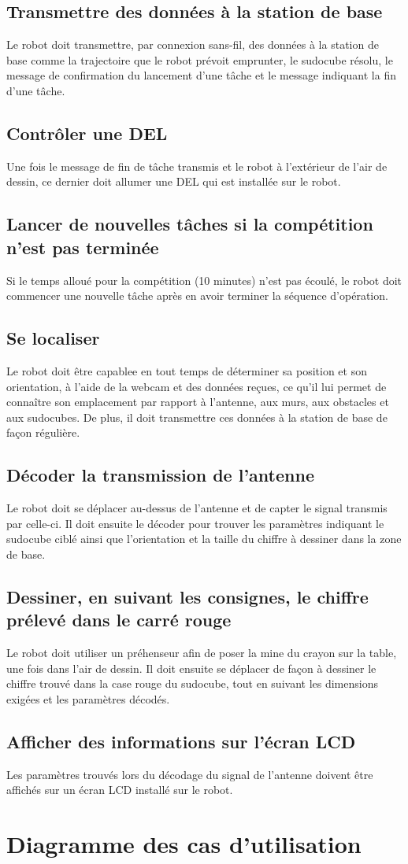 \subsection{Transmettre des données à la station de base}
Le robot doit transmettre, par connexion sans-fil, des données à la station de base comme la trajectoire que le robot prévoit emprunter, le sudocube résolu, le message de confirmation du lancement d'une tâche et le message indiquant la fin d'une tâche.
\subsection{Contrôler une DEL}
Une fois le message de fin de tâche transmis et le robot à l'extérieur de l'air de dessin, ce dernier doit allumer une DEL qui est installée sur le robot.
\subsection{Lancer de nouvelles tâches si la compétition n'est pas terminée}
Si le temps alloué pour la compétition (10 minutes) n'est pas écoulé, le robot doit commencer une nouvelle tâche après en avoir terminer la séquence d'opération.
\subsection{Se localiser}
Le robot doit être capablee en tout temps de déterminer sa position et son orientation, à l'aide de la webcam et des données reçues, ce qu'il lui permet de connaître son emplacement par rapport à l'antenne, aux murs, aux obstacles et aux sudocubes. De plus, il doit transmettre ces données à la station de base de façon régulière.
\subsection{Décoder la transmission de l'antenne}
Le robot doit se déplacer au-dessus de l'antenne et de capter le signal transmis par celle-ci. Il doit ensuite le décoder pour trouver les paramètres indiquant le sudocube ciblé ainsi que l'orientation et la taille du chiffre à dessiner dans la zone de base.
\subsection{Dessiner, en suivant les consignes, le chiffre prélevé dans le carré rouge}
Le robot doit utiliser un préhenseur afin de poser la mine du crayon sur la table, une fois dans l'air de dessin. Il doit ensuite se déplacer de façon à dessiner le chiffre trouvé dans la case rouge du sudocube, tout en suivant les dimensions exigées et les paramètres décodés. 
\subsection{Afficher des informations sur l'écran LCD}
Les paramètres trouvés lors du décodage du signal de l'antenne doivent être affichés sur un écran LCD installé sur le robot.
\section{Diagramme des cas d'utilisation}
\label{use_cases}
\addtolength{\evensidemargin}{-1in}	
